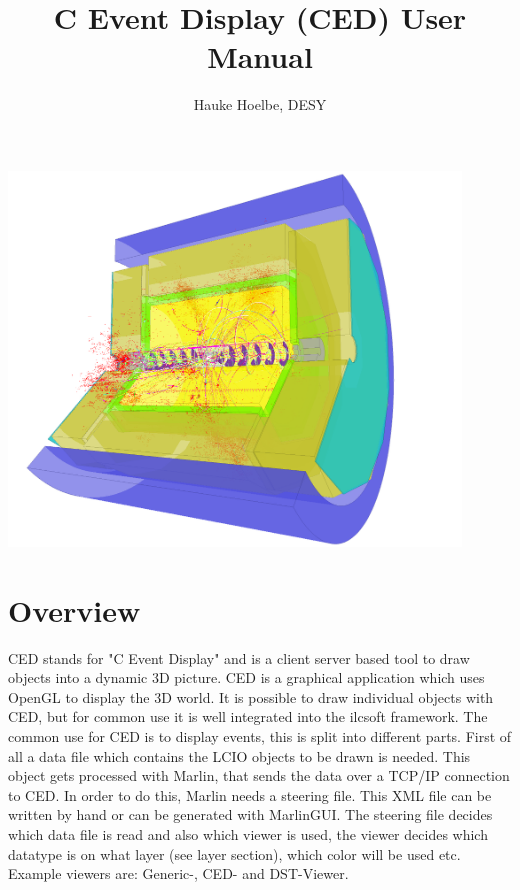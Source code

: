 \documentclass[a4paper,10pt]{article}
\title{C Event Display (CED) User Manual}
\author{Hauke Hoelbe, DESY}
\begin{document}
\maketitle
\bigskip
\bigskip
\bigskip
\bigskip
\bigskip
\bigskip


\begin{center}
 \includegraphics[width=12cm]{title3b.png}
\end{center}
\newpage

\tableofcontents
\newpage
\section{Overview}
CED stands for "C Event Display" and is a client server based tool to draw objects into a dynamic 3D picture. CED is a graphical application which uses OpenGL to display the 3D world. It is possible to draw individual objects with CED, but for common use it is well integrated into the ilcsoft framework.
\newline\newline
The common use for CED is to display events, this is split into different parts. First of all a data file which contains the LCIO objects to be drawn is needed. This object gets processed with Marlin, that sends the data over a TCP/IP connection to CED. In order to do this, Marlin needs a steering file. This XML file can be written by hand or can be generated with MarlinGUI.
\newline\newline
The steering file decides which data file is read and also which viewer is used, the viewer decides which datatype is on what layer (see layer section), which color will be used etc. Example viewers are: Generic-, CED- and DST-Viewer.
\end{document}
